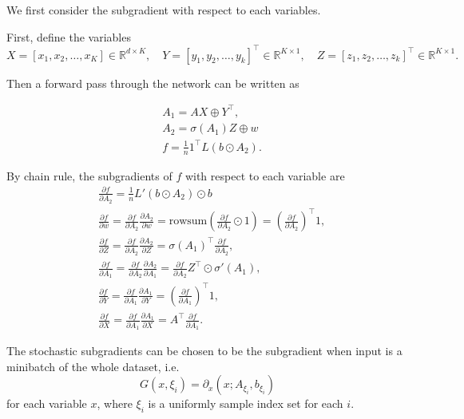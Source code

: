 \documentclass{article}
\numberwithin{equation}{section}
\numberwithin{figure}{section}
\begin{document}
We first consider the subgradient with respect to each variables. 

First, define the variables
\begin{equation}
X = [x_1, x_2, \hdots, x_K] \in\mathbb{R}^{d\times K}, \quad Y = [y_1, y_2, \hdots, y_k]^\top \in\mathbb{R}^{K\times 1}, \quad Z = [z_1, z_2, \hdots, z_k]^\top \in\mathbb{R}^{K\times 1}.
\end{equation}

Then a forward pass through the network can be written as

\begin{equation}
\begin{aligned}
&A_1 = AX\oplus Y^\top, \\
&A_2 = \sigma(A_1)Z \oplus w \\
&f = \frac{1}{n}1^\top L(b\odot A_2).
\end{aligned}
\end{equation}

By chain rule, the subgradients of $f$ with respect to each variable are
\begin{equation}
\begin{aligned}
&\frac{\partial f}{\partial A_2} = \frac{1}{n}L'(b\odot A_2)\odot b \\
&\frac{\partial f}{\partial w} = \frac{\partial f}{\partial A_2}\frac{\partial A_2}{\partial w} = \text{rowsum}(\frac{\partial f}{\partial A_2}\odot 1) = \left(\frac{\partial f}{\partial A_2}\right)^\top 1, \\
&\frac{\partial f}{\partial Z} = \frac{\partial f}{\partial A_2}\frac{\partial A_2}{\partial Z} = \sigma(A_1)^\top \frac{\partial f}{\partial A_2}, \\
&\frac{\partial f}{\partial A_1} = \frac{\partial f}{\partial A_2}\frac{\partial A_2}{\partial A_1} = \frac{\partial f}{\partial A_2}Z^\top \odot \sigma'(A_1), \\
&\frac{\partial f}{\partial Y} = \frac{\partial f}{\partial A_1}\frac{\partial A_1}{\partial Y} = \left(\frac{\partial f}{\partial A_1}\right)^\top 1, \\
&\frac{\partial f}{\partial X} = \frac{\partial f}{\partial A_1}\frac{\partial A_1}{\partial X} = A^\top \frac{\partial f}{\partial A_1}.
\end{aligned}
\end{equation}

The stochastic subgradients can be chosen to be the subgradient when input is a minibatch of the whole dataset, i.e.
\begin{equation}
G(x, \xi_i) = \partial_x(x; A_{\xi_i}, b_{\xi_i})
\end{equation}
for each variable $x$, where $\xi_i $ is a uniformly sample index set for each $i$.
\end{document}
